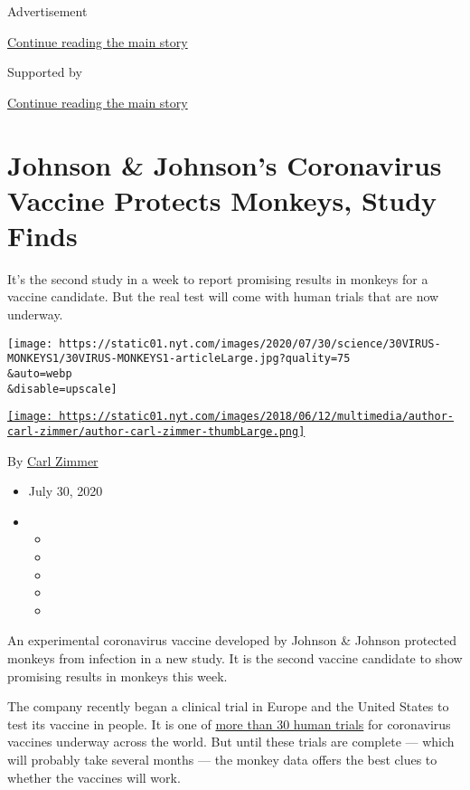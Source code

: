 Advertisement

\protect\hyperlink{after-top}{Continue reading the main story}

Supported by

\protect\hyperlink{after-sponsor}{Continue reading the main story}

\hypertarget{johnson--johnsons-coronavirus-vaccine-protects-monkeys-study-finds}{%
\section{Johnson \& Johnson's Coronavirus Vaccine Protects Monkeys,
Study
Finds}\label{johnson--johnsons-coronavirus-vaccine-protects-monkeys-study-finds}}

It's the second study in a week to report promising results in monkeys
for a vaccine candidate. But the real test will come with human trials
that are now underway.

\texttt{[image: https://static01.nyt.com/images/2020/07/30/science/30VIRUS-MONKEYS1/30VIRUS-MONKEYS1-articleLarge.jpg?quality=75\\\&auto=webp\\\&disable=upscale]}

\href{https://www.nytimes.com/by/carl-zimmer}{\texttt{[image: https://static01.nyt.com/images/2018/06/12/multimedia/author-carl-zimmer/author-carl-zimmer-thumbLarge.png]}}

By \href{https://www.nytimes.com/by/carl-zimmer}{Carl Zimmer}

\begin{itemize}
\item
  July 30, 2020
\item
  \begin{itemize}
  \item
  \item
  \item
  \item
  \item
  \end{itemize}
\end{itemize}

An experimental coronavirus vaccine developed by Johnson \& Johnson
protected monkeys from infection in a new study. It is the second
vaccine candidate to show promising results in monkeys this week.

The company recently began a clinical trial in Europe and the United
States to test its vaccine in people. It is one of
\href{https://www.nytimes.com/interactive/2020/science/coronavirus-vaccine-tracker.html}{more
than 30 human trials} for coronavirus vaccines underway across the
world. But until these trials are complete --- which will probably take
several months --- the monkey data offers the best clues to whether the
vaccines will work.

